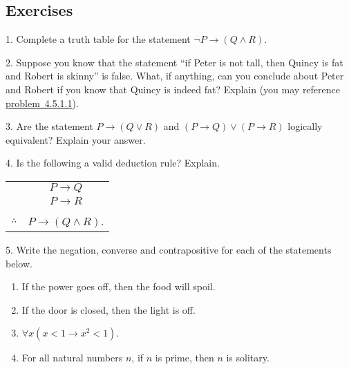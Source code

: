\documentclass[10pt,]{book}
\theoremstyle{plain}
\theoremstyle{definition}
\theoremstyle{definition}
\theoremstyle{definition}
\numberwithin{equation}{chapter}
\newcommand{\hrulethin}  {\noalign{\hrule height 0.04em}}
\def\imp{\rightarrow}
\newcommand{\lt}{ < }
\begin{document}
\subsection[Exercises]{Exercises}\label{exercises-23}
\begin{exerciselist}
\item[1.]\hypertarget{tt}{}
            Complete a truth table for the statement \(\neg P \imp (Q \wedge R)\).
\par\smallskip
\item[2.]\hypertarget{exercise-245}{}
            Suppose you know that the statement ``if Peter is not tall, then Quincy is fat and Robert is skinny'' is false. What, if anything, can you conclude about Peter and Robert if you know that Quincy is indeed fat? Explain (you may reference
            \hyperlink{tt}{problem~4.5.1.1}).
\par\smallskip
\item[3.]\hypertarget{exercise-246}{}
            Are the statement \(P \imp (Q \vee R)\) and \((P \imp Q) \vee (P \imp R)\) logically equivalent? Explain your answer.
\par\smallskip
\item[4.]\hypertarget{exercise-247}{}
            Is the following a valid deduction rule? Explain.
\leavevmode%
\begin{table}
\centering
\begin{tabular}{cc}
&\(P \imp Q\)\tabularnewline[0pt]
&\(P\imp R\)\tabularnewline[0pt]
&\tabularnewline\hrulethin
\(\therefore\)&\(P \imp (Q \wedge R)\).
\end{tabular}
\end{table}
\par\smallskip
\item[5.]\hypertarget{exercise-248}{}
            Write the negation, converse and contrapositive for each of the statements below.
\leavevmode%
\begin{enumerate}[label=(\alph*)]
\item\hypertarget{li-1119}{}
                If the power goes off, then the food will spoil.
\item\hypertarget{li-1120}{}
                If the door is closed, then the light is off.
\item\hypertarget{li-1121}{}\(\forall x (x \lt  1 \imp x^2 \lt  1)\).%
\item\hypertarget{li-1122}{}
                For all natural numbers \(n\), if \(n\) is prime, then \(n\) is solitary.

\end{enumerate}
\end{exerciselist}
\end{document}
